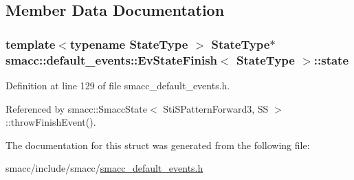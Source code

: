 \subsection{Member Data Documentation}
\subsubsection[{\texorpdfstring{state}{state}}]{\setlength{\rightskip}{0pt plus 5cm}template$<$typename State\+Type $>$ State\+Type$\ast$ {\bf smacc\+::default\+\_\+events\+::\+Ev\+State\+Finish}$<$ State\+Type $>$\+::state}\hypertarget{structsmacc_1_1default__events_1_1EvStateFinish_ad598cccf2b8ddb507f3c0efba2232d62}{}\label{structsmacc_1_1default__events_1_1EvStateFinish_ad598cccf2b8ddb507f3c0efba2232d62}


Definition at line 129 of file smacc\+\_\+default\+\_\+events.\+h.



Referenced by smacc\+::\+Smacc\+State$<$ Sti\+S\+Pattern\+Forward3, S\+S $>$\+::throw\+Finish\+Event().



The documentation for this struct was generated from the following file\+:\begin{DoxyCompactItemize}
\item 
smacc/include/smacc/\hyperlink{smacc__default__events_8h}{smacc\+\_\+default\+\_\+events.\+h}\end{DoxyCompactItemize}
